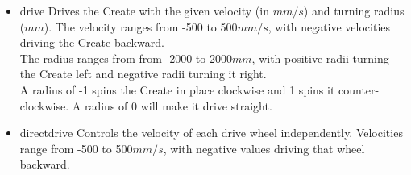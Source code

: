 \documentclass {article}
\begin{document}
\begin {itemize}
\item {} {drive} Drives the
  Create with the given velocity (in $mm/s$) and turning radius
  ($mm$).  The velocity ranges from -500 to 500$mm/s$, with negative
  velocities driving the Create
  backward. \\
  The radius ranges from from -2000 to 2000$mm$, with positive radii
  turning the Create left
  and negative radii turning it right. \\
  A radius of -1 spins the Create in place clockwise and 1 spins it
  counter-clockwise.  A
  radius of 0 will make it drive straight. \\
  \retnorm

\item {}
  {directdrive} Controls the velocity of each drive wheel
  independently.  Velocities range from -500 to
  500$mm/s$, with negative values driving that wheel backward. \\
  \retnorm


\end{itemize}
\end{document}
